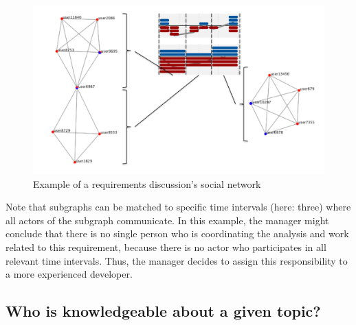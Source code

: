 \begin{figure}
\includegraphics[width=\columnwidth]{img/example-sn}
\caption{Example of a requirements discussion's social network}
\label{fig:example-sn}
\end{figure}


Note that subgraphs can be matched to specific time intervals (here: three) where all actors of the subgraph communicate. 
In this example, the manager might conclude that there is no single person who is coordinating the analysis and work related to this requirement, because there is no actor who participates in all relevant time intervals.
Thus, the manager decides to assign this responsibility to a more experienced developer.

\subsection{Who is knowledgeable about a given topic?}

